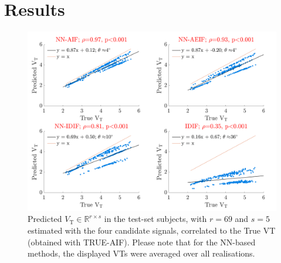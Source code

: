     \section{Results} \label{sec:a_bayesian_neural_network-based_method_for_the_extraction_of_a_metabolite_corrected_arterial_input_function_from_dynamic_pbr28_pet_appendix_results}
        \begin{figure}
            \centering
            
            \includegraphics[width=1.0\linewidth]{figures/arterial_input_function_correlation.png}
            
            \captionsetup{singlelinecheck=false, justification=centering}
            \caption{
                Predicted $V_{\mathrm{T}} \in \mathbb{R}^{r \times s}$ in the test-set subjects, with $r = 69$ and $s=5$ estimated with the four candidate signals, correlated to the True \gls{VT} (obtained with TRUE-\gls{AIF}). Please note that for the \gls{NN}-based methods, the displayed \glspl{VT} were averaged over all realisations.
            }
            \label{fig:a_bayesian_neural_network-based_method_for_the_extraction_of_a_metabolite_corrected_arterial_input_function_from_dynamic_pbr28_pet_appendix_results_correlation}
       \end{figure}
    
